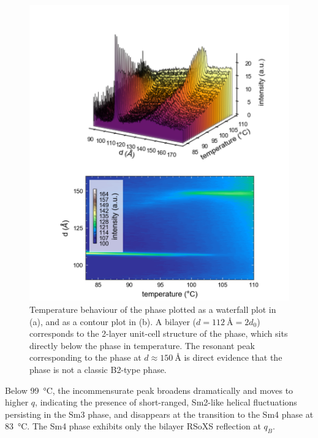 \documentclass[aagreenthesis]{subfiles}
\begin{document}
\begin{figure}[h!]
    \centering
    \includegraphics[width=.8\textwidth]{figs/pal30/rsoxssm2/sm2-rsoxs.png}
    \caption{\label{fig:pal30:diffractVt} Temperature behaviour of the
    \smcpalpha{} phase plotted as a waterfall plot in (a), and as a contour plot
    in (b). A bilayer ($d=\SI{112}{\angstrom} =2d_0$) corresponds to the 2-layer
unit-cell structure of the \smcapa{} phase, which sits directly below the
\smcpalpha phase in temperature. The resonant peak corresponding to the
\smcpalpha{} phase at $d\approx\SI{150}{\angstrom}$ is direct evidence that the
\smcpalpha{} phase is not a classic B2-type phase.}
\end{figure}


Below \SI{99}{\degreeCelsius}, the incommensurate peak broadens dramatically and
moves to higher $q$, indicating the presence of short-ranged, Sm2-like helical
fluctuations persisting in the Sm3 phase, and disappears at the transition to the Sm4
phase at \SI{83}{\degreeCelsius}. The Sm4 phase exhibits only the bilayer RSoXS
reflection at $q_B$.
\end{document}
